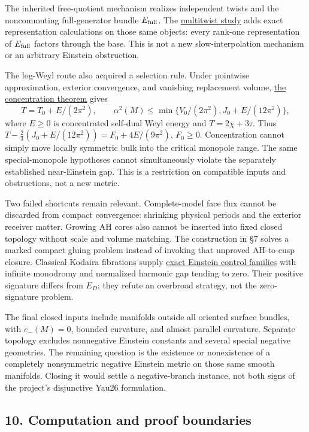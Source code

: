 \documentclass[
  english,
]{article}
\begin{document}
The inherited free-quotient mechanism realizes independent twists and
the noncommuting full-generator bundle \(E_{\rm full}\). The
\href{../proofs/round8_multitwist.md}{multitwist study} adds exact
representation calculations on those same objects: every rank-one
representation of \(E_{\rm full}\) factors through the base. This is not
a new slow-interpolation mechanism or an arbitrary Einstein obstruction.

The log-Weyl route also acquired a selection rule. Under pointwise
approximation, exterior convergence, and vanishing replacement volume,
\href{../proofs/round7_endpoint.md}{the concentration theorem} gives \[
T=T_0+E/(2\pi^2),\qquad
\alpha^2(M)\le\min\{V_0/(2\pi^2),J_0+E/(12\pi^2)\},
\] where \(E\ge0\) is concentrated self-dual Weyl energy and
\(T=2\chi+3\tau\). Thus \(T-\tfrac23(J_0+E/(12\pi^2))=F_0+4E/(9\pi^2)\),
\(F_0\ge0\). Concentration cannot simply move locally symmetric bulk
into the critical monopole range. The same special-monopole hypotheses
cannot simultaneously violate the separately established near-Einstein
gap. This is a restriction on compatible inputs and obstructions, not a
new metric.

Two failed shortcuts remain relevant. Complete-model face flux cannot be
discarded from compact convergence: shrinking physical periods and the
exterior receiver matter. Growing AH cores also cannot be inserted into
fixed closed topology without scale and volume matching. The
construction in §7 solves a marked compact gluing problem instead of
invoking that unproved AH-to-cusp closure. Classical Kodaira fibrations
supply \href{../proofs/round10_bundle.md}{exact Einstein control
families} with infinite monodromy and normalized harmonic gap tending to
zero. Their positive signature differs from \(E_D\); they refute an
overbroad strategy, not the zero-signature problem.

The final closed inputs include manifolds outside all oriented surface
bundles, with \(e_-(M)=0\), bounded curvature, and almost parallel
curvature. Separate topology excludes nonnegative Einstein constants and
several special negative geometries. The remaining question is the
existence or nonexistence of a completely nonsymmetric negative Einstein
metric on those same smooth manifolds. Closing it would settle a
negative-branch instance, not both signs of the project's disjunctive
Yau26 formulation.

\hypertarget{computation-and-proof-boundaries}{%
\subsection{10. Computation and proof
boundaries}\label{computation-and-proof-boundaries}}
\end{document}
